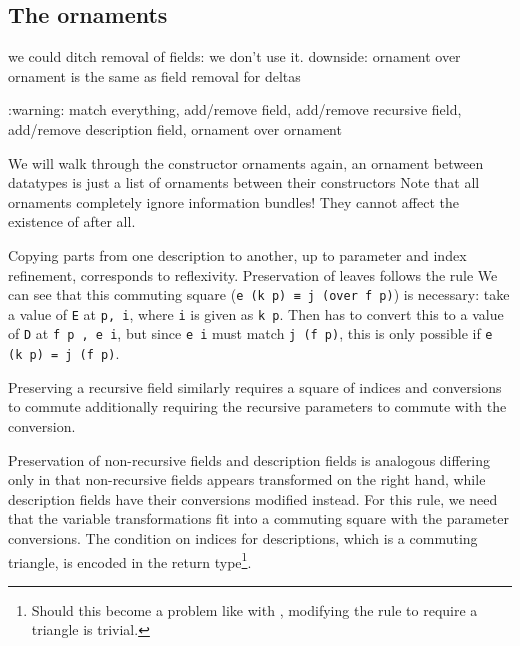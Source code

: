\begin{outline}    
\section{The ornaments}
we could ditch removal of fields: we don't use it. downside: ornament over ornament is the same as field removal for deltas

:warning: match everything, add/remove field, add/remove recursive field, add/remove description field, ornament over ornament




We will walk through the constructor ornaments
again, an ornament between datatypes is just a list of ornaments between their constructors
Note that all ornaments completely ignore information bundles! They cannot affect the existence of  after all.

Copying parts from one description to another, up to parameter and index refinement, corresponds to reflexivity. Preservation of leaves follows the rule
We can see that this commuting square (\texttt{e (k p) ≡ j (over f p)}) is necessary: take a value of \texttt{E} at \texttt{p, i}, where \texttt{i} is given as \texttt{k p}. Then  has to convert this to a value of \texttt{D} at \texttt{f p , e i}, but since \texttt{e i} must match \texttt{j (f p)}, this is only possible if \texttt{e (k p) = j (f p)}.

Preserving a recursive field similarly requires a square of indices and conversions to commute
additionally requiring the recursive parameters to commute with the conversion. 

Preservation of non-recursive fields and description fields is analogous
differing only in that non-recursive fields appears transformed on the right hand, while description fields have their conversions modified instead. For this rule, we need that the variable transformations fit into a commuting square with the parameter conversions. The condition on indices for descriptions, which is a commuting triangle, is encoded in the return type\footnote{Should this become a problem like with , modifying the rule to require a triangle is trivial.}.


\end{outline}
